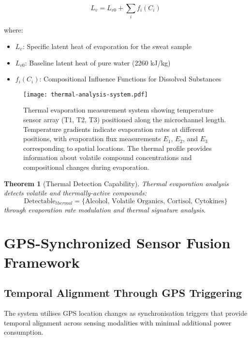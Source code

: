\documentclass[12pt,a4paper]{article}
\newtheorem{theorem}{Theorem}[section]
\begin{document}
\begin{equation}
L_v = L_{v0} + \sum_{i} f_i(C_i)
\end{equation}

where:
\begin{itemize}
\item $L_v$: Specific latent heat of evaporation for the sweat sample
\item $L_{v0}$: Baseline latent heat of pure water (2260 kJ/kg)
\item $f_i(C_i)$: Compositional Influence Functions for Dissolved Substances
\end{itemize}

\begin{figure}[htbp]
\centering
\texttt{[image: thermal-analysis-system.pdf]}
\caption{Thermal evaporation measurement system showing temperature sensor array (T1, T2, T3) positioned along the microchannel length. Temperature gradients indicate evaporation rates at different positions, with evaporation flux measurements \(E_1\), \(E_2\), and \(E_3\) corresponding to spatial locations. The thermal profile provides information about volatile compound concentrations and compositional changes during evaporation.}
\label{fig:thermal-analysis-system}
\end{figure}

\begin{theorem}[Thermal Detection Capability]
Thermal evaporation analysis detects volatile and thermally-active compounds:
\begin{equation}
\text{Detectable}_{thermal} = \{\text{Alcohol, Volatile Organics, Cortisol, Cytokines}\}
\end{equation}
through evaporation rate modulation and thermal signature analysis.
\end{theorem}

\section{GPS-Synchronized Sensor Fusion Framework}

\subsection{Temporal Alignment Through GPS Triggering}

The system utilises GPS location changes as synchronisation triggers that provide temporal alignment across sensing modalities with minimal additional power consumption.
\end{document}
